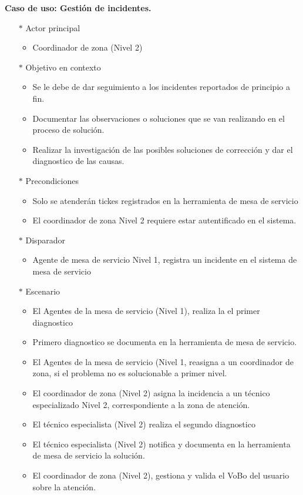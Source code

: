\begin{multicols}{2}

	\textbf{Caso de uso: Gestión de incidentes.}
	\begin{itemize}
		\item[$*$]  Actor principal
		\begin{itemize}
			\item Coordinador de zona (Nivel 2)
		\end{itemize}
		\item[$*$]  Objetivo en contexto
		\begin{itemize}
			\item Se le debe de dar seguimiento a los incidentes reportados de principio a fin.
			\item Documentar las observaciones o soluciones que se van realizando en el proceso de solución.
			\item Realizar la investigación de las posibles soluciones de corrección y dar el diagnostico de las causas.
		\end{itemize}
		\item[$*$]  Precondiciones
		\begin{itemize}
			\item Solo se atenderán tickes registrados en la herramienta de mesa de servicio
			\item El coordinador de zona Nivel 2 requiere estar autentificado en el sistema.
			
		\end{itemize}	
		\item[$*$]  Disparador
		\begin{itemize}
			\item Agente de mesa de servicio Nivel 1, registra un incidente en el sistema de mesa de servicio 
		\end{itemize}
		\item[$*$]  Escenario
		\begin{itemize}
			\item El Agentes de la mesa de servicio (Nivel 1), realiza la el primer diagnostico 
			\item Primero diagnostico se documenta en la herramienta de mesa de servicio.
			\item El Agentes de la mesa de servicio (Nivel 1, reasigna a un coordinador de zona, si el problema no es solucionable a primer nivel. 
			\item El coordinador de zona (Nivel 2) asigna la incidencia a un técnico especializado Nivel 2, correspondiente a la zona de atención. 
			\item El técnico especialista (Nivel 2) realiza el segundo diagnostico 
			\item El técnico especialista (Nivel 2) notifica y documenta en la herramienta de mesa de servicio la solución.
			\item El coordinador de zona (Nivel 2), gestiona y valida el VoBo del usuario sobre la atención. 
			

\end{itemize}
\end{itemize}
\end{multicols}
